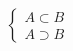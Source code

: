 \documentclass[preview]{standalone}
\begin{document}
\begin{align*}
\begin{cases}
                         A \subset B \\
                         A \supset B 
                         \end{cases}
\end{align*}
\end{document}
